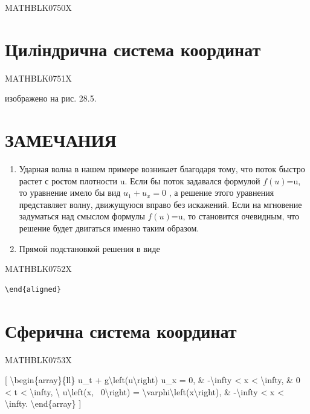 \documentclass[
]{article}
\begin{document}
MATHBLK0750X

\section{Циліндрична система
координат}\label{ux446ux438ux43bux456ux43dux434ux440ux438ux447ux43dux430-ux441ux438ux441ux442ux435ux43cux430-ux43aux43eux43eux440ux434ux438ux43dux430ux442}

MATHBLK0751X

изображено на рис. 28.5.

\section{ЗАМЕЧАНИЯ}\label{ux437ux430ux43cux435ux447ux430ux43dux438ux44f-9}

\begin{enumerate}
\def\labelenumi{\arabic{enumi}.}
\item
  Ударная волна в нашем примере возникает благодаря тому, что поток
  быстро растет с ростом плотности u. Если бы поток задавался формулой
  \(f(u)\)=u, то уравнение имело бы вид \(u_1+u_x=0\) , а решение этого
  уравнения представляет волну, движущуюся вправо без искажений. Если на
  мгновение задуматься над смыслом формулы \(f(u)\)=u, то становится
  очевидным, что решение будет двигаться именно таким образом.
\item
  Прямой подстановкой решения в виде
\end{enumerate}

MATHBLK0752X

\begin{verbatim}
\end{aligned}
\end{verbatim}

\section{Сферична система
координат}\label{ux441ux444ux435ux440ux438ux447ux43dux430-ux441ux438ux441ux442ux435ux43cux430-ux43aux43eux43eux440ux434ux438ux43dux430ux442}

MATHBLK0753X

{[} \textbackslash begin\{array\}\{ll\} u\_t +
g\textbackslash left(u\textbackslash right) u\_x = 0, \&
-\textbackslash infty \textless{} x \textless{} \textbackslash infty, \&
0 \textless{} t \textless{} \textbackslash infty, \textbackslash{}
u\textbackslash left(x, ~0\textbackslash right) =
\textbackslash varphi\textbackslash left(x\textbackslash right), \&
-\textbackslash infty \textless{} x \textless{} \textbackslash infty.
\textbackslash end\{array\} {]}
\end{document}
